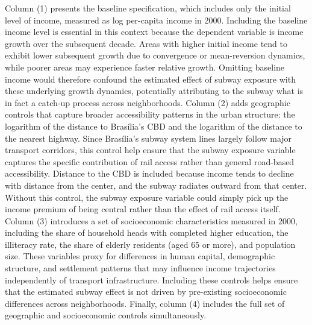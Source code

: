 Column (1) presents the baseline specification, which includes only the initial level of income, measured as log per-capita income in 2000. Including the baseline income level is essential in this context because the dependent variable is income growth over the subsequent decade. Areas with higher initial income tend to exhibit lower subsequent growth due to convergence or mean-reversion dynamics, while poorer areas may experience faster relative growth. Omitting baseline income would therefore confound the estimated effect of subway exposure with these underlying growth dynamics, potentially attributing to the subway what is in fact a catch-up process across neighborhoods. Column (2) adds geographic controls that capture broader accessibility patterns in the urban structure: the logarithm of the distance to Brasília's CBD and the logarithm of the distance to the nearest highway. Since Brasília's subway system lines largely follow major transport corridors, this control help ensure that the subway exposure variable captures the specific contribution of rail access rather than general road-based accessibility. Distance to the CBD is included because income tends to decline with distance from the center, and the subway radiates outward from that center. Without this control, the subway exposure variable could simply pick up the income premium of being central rather than the effect of rail access itself. Column (3) introduces a set of socioeconomic characteristics measured in 2000, including the share of household heads with completed higher education, the illiteracy rate, the share of elderly residents (aged 65 or more), and population size. These variables proxy for differences in human capital, demographic structure, and settlement patterns that may influence income trajectories independently of transport infrastructure. Including these controls helps ensure that the estimated subway effect is not driven by pre-existing socioeconomic differences across neighborhoods. Finally, column (4) includes the full set of geographic and socioeconomic controls simultaneously. 

